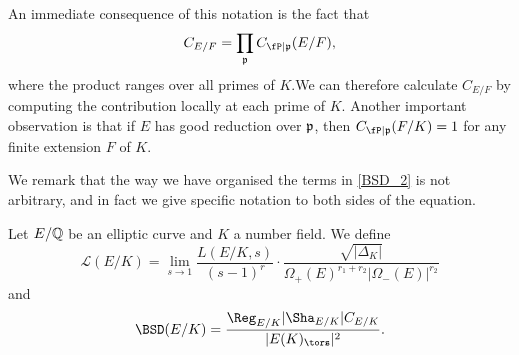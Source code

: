 An immediate consequence of this notation is the fact that 
$$C_{E/F}=\prod_{\pp}C_{\fP\mid \pp}(E/F),$$ where the product ranges over all primes of $K$.We can therefore calculate $C_{E/F}$ by computing the contribution locally at each prime of $K$. Another important observation is that if $E$ has good reduction over $\mathfrak{p}$, then $C_{\fP\mid\pp}(F/K)=1$ for any finite extension $F$ of $K$. 

We remark that the way we have organised the terms in \eqref{BSD_2} is not arbitrary, and in fact we give specific notation to both sides of the equation. 

\begin{notation}
    Let $E/\mathbb{Q}$ be an elliptic curve and $K$ a number field. We define 
    $$\mathcal{L}(E/K)=\lim_{s\to1}\frac{L(E/K,s)}{(s-1)^r}\cdot\frac{\sqrt{|\Delta_K|}}{\Omega_+(E)^{r_1+r_2}|\Omega_-(E)|^{r_2}}$$
    and
    $$\BSD(E/K)=\frac{\Reg_{E/K}|\Sha_{E/K}|C_{E/K}}{|E(K)_{\tors}|^2}.$$
\end{notation}


